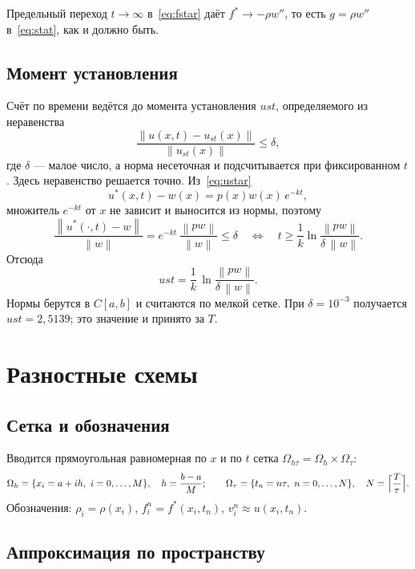 \documentclass[12pt,a4paper]{article}
\newcommand{\norm}[1]{\left\|#1\right\|}
\begin{document}
Предельный переход $t\to\infty$ в~\eqref{eq:fstar} даёт
$f^*\to-\rho w''$, то есть $g=\rho w''$ в~\eqref{eq:stat}, как и должно
быть.

\subsection{Момент установления}

Счёт по времени ведётся до момента установления $ust$, определяемого из
неравенства
\begin{equation}\label{eq:settle_def}
\frac{\norm{u(x,t)-u_{st}(x)}}{\norm{u_{st}(x)}}\le\delta,
\end{equation}
где $\delta$ --- малое число, а норма несеточная и подсчитывается при
фиксированном $t$. Здесь неравенство решается точно. Из~\eqref{eq:ustar}
\[
u^*(x,t)-w(x)=p(x)w(x)\,e^{-kt},
\]
множитель $e^{-kt}$ от $x$ не зависит и выносится из нормы, поэтому
\[
\frac{\norm{u^*(\cdot,t)-w}}{\norm{w}}
=e^{-kt}\,\frac{\norm{pw}}{\norm{w}}\le\delta
\quad\Longleftrightarrow\quad
t\ge\frac1k\ln\frac{\norm{pw}}{\delta\,\norm{w}} .
\]
Отсюда
\begin{equation}\label{eq:settle}
ust=\frac1k\,\ln\frac{\norm{pw}}{\delta\,\norm{w}} .
\end{equation}
Нормы берутся в $C[a,b]$ и считаются по мелкой сетке. При $\delta=10^{-3}$
получается $ust=2{,}5139$; это значение и принято за $T$.

\section{Разностные схемы}

\subsection{Сетка и обозначения}

Вводится прямоугольная равномерная по $x$ и по $t$ сетка
$\Omega_{h\tau}=\Omega_h\times\Omega_\tau$:
\[
\Omega_h=\{x_i=a+ih,\ i=0,\dots,M\},\quad h=\frac{b-a}{M};\qquad
\Omega_\tau=\{t_n=n\tau,\ n=0,\dots,N\},\quad N=\Bigl\lceil\frac T\tau\Bigr\rceil .
\]
Обозначения: $\rho_i=\rho(x_i)$, $f_i^n=f^*(x_i,t_n)$,
$v_i^n\approx u(x_i,t_n)$.

\subsection{Аппроксимация по пространству}
\end{document}
